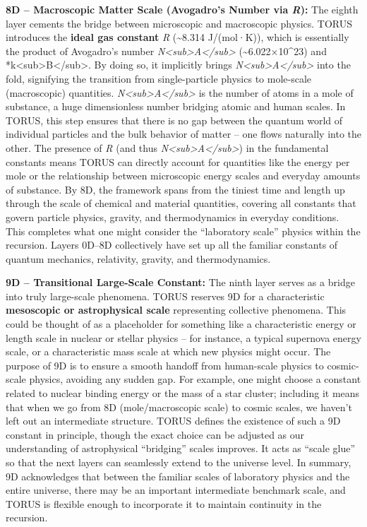 \documentclass[]{article}
\begin{document}
\textbf{8D -- Macroscopic Matter Scale (Avogadro's Number via
\emph{R}):} The eighth layer cements the bridge between microscopic and
macroscopic physics. TORUS introduces the \textbf{ideal gas constant}
\emph{R} (\textasciitilde{}8.314 J/(mol·K)), which is essentially the
product of Avogadro's number
\emph{N\textless{}sub\textgreater{}A\textless{}/sub\textgreater{}}
(\textasciitilde{}6.022×10\^{}23) and
*k\textless{}sub\textgreater{}B\textless{}/sub\textgreater{}. By doing
so, it implicitly brings
\emph{N\textless{}sub\textgreater{}A\textless{}/sub\textgreater{}} into
the fold, signifying the transition from single-particle physics to
mole-scale (macroscopic) quantities.
\emph{N\textless{}sub\textgreater{}A\textless{}/sub\textgreater{}} is
the number of atoms in a mole of substance, a huge dimensionless number
bridging atomic and human scales. In TORUS, this step ensures that there
is no gap between the quantum world of individual particles and the bulk
behavior of matter -- one flows naturally into the other. The presence
of \emph{R} (and thus
\emph{N\textless{}sub\textgreater{}A\textless{}/sub\textgreater{}}) in
the fundamental constants means TORUS can directly account for
quantities like the energy per mole or the relationship between
microscopic energy scales and everyday amounts of substance. By 8D, the
framework spans from the tiniest time and length up through the scale of
chemical and material quantities, covering all constants that govern
particle physics, gravity, and thermodynamics in everyday conditions.
This completes what one might consider the ``laboratory scale'' physics
within the recursion. Layers 0D--8D collectively have set up all the
familiar constants of quantum mechanics, relativity, gravity, and
thermodynamics.

\textbf{9D -- Transitional Large-Scale Constant:} The ninth layer serves
as a bridge into truly large-scale phenomena. TORUS reserves 9D for a
characteristic \textbf{mesoscopic or astrophysical scale} representing
collective phenomena. This could be thought of as a placeholder for
something like a characteristic energy or length scale in nuclear or
stellar physics -- for instance, a typical supernova energy scale, or a
characteristic mass scale at which new physics might occur. The purpose
of 9D is to ensure a smooth handoff from human-scale physics to
cosmic-scale physics, avoiding any sudden gap. For example, one might
choose a constant related to nuclear binding energy or the mass of a
star cluster; including it means that when we go from 8D
(mole/macroscopic scale) to cosmic scales, we haven't left out an
intermediate structure. TORUS defines the existence of such a 9D
constant in principle, though the exact choice can be adjusted as our
understanding of astrophysical ``bridging'' scales improves. It acts as
``scale glue'' so that the next layers can seamlessly extend to the
universe level. In summary, 9D acknowledges that between the familiar
scales of laboratory physics and the entire universe, there may be an
important intermediate benchmark scale, and TORUS is flexible enough to
incorporate it to maintain continuity in the recursion.
\end{document}
